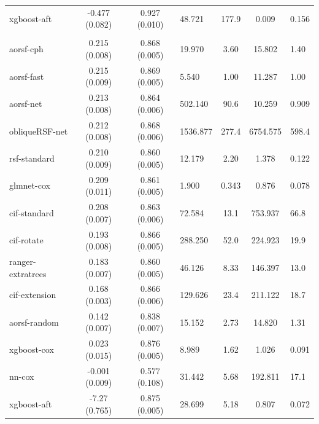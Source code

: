 \documentclass[twoside,11pt]{article}\usepackage[]{graphicx}\usepackage[]{xcolor}
\newenvironment{knitrout}{}{} %
\begin{document}
\begin{knitrout}
\begin{longtable}{lcclccl}
\hspace{1em}xgboost-aft & -0.477 (0.082) & 0.927 (0.010) & 48.721 & 177.9 & 0.009 & 0.156\\
\addlinespace[0.3em]
\hline
\multicolumn{7}{l}{\textit{\textbf{Non-alcohol fatty liver disease; death, n = 17549, p = 24}}}\\
\hline
\hspace{1em}aorsf-cph & 0.215 (0.008) & 0.868 (0.005) & 19.970 & 3.60 & 15.802 & 1.40\\
\hspace{1em}aorsf-fast & 0.215 (0.009) & 0.869 (0.005) & 5.540 & 1.00 & 11.287 & 1.00\\
\hspace{1em}aorsf-net & 0.213 (0.008) & 0.864 (0.006) & 502.140 & 90.6 & 10.259 & 0.909\\
\hspace{1em}obliqueRSF-net & 0.212 (0.008) & 0.868 (0.006) & 1536.877 & 277.4 & 6754.575 & 598.4\\
\hspace{1em}rsf-standard & 0.210 (0.009) & 0.860 (0.005) & 12.179 & 2.20 & 1.378 & 0.122\\
\hspace{1em}glmnet-cox & 0.209 (0.011) & 0.861 (0.005) & 1.900 & 0.343 & 0.876 & 0.078\\
\hspace{1em}cif-standard & 0.208 (0.007) & 0.863 (0.006) & 72.584 & 13.1 & 753.937 & 66.8\\
\hspace{1em}cif-rotate & 0.193 (0.008) & 0.866 (0.005) & 288.250 & 52.0 & 224.923 & 19.9\\
\hspace{1em}ranger-extratrees & 0.183 (0.007) & 0.860 (0.005) & 46.126 & 8.33 & 146.397 & 13.0\\
\hspace{1em}cif-extension & 0.168 (0.003) & 0.866 (0.006) & 129.626 & 23.4 & 211.122 & 18.7\\
\hspace{1em}aorsf-random & 0.142 (0.007) & 0.838 (0.007) & 15.152 & 2.73 & 14.820 & 1.31\\
\hspace{1em}xgboost-cox & 0.023 (0.015) & 0.876 (0.005) & 8.989 & 1.62 & 1.026 & 0.091\\
\hspace{1em}nn-cox & -0.001 (0.009) & 0.577 (0.108) & 31.442 & 5.68 & 192.811 & 17.1\\
\hspace{1em}xgboost-aft & -7.27 (0.765) & 0.875 (0.005) & 28.699 & 5.18 & 0.807 & 0.072\\

\end{longtable}
\end{knitrout}
\end{document}
